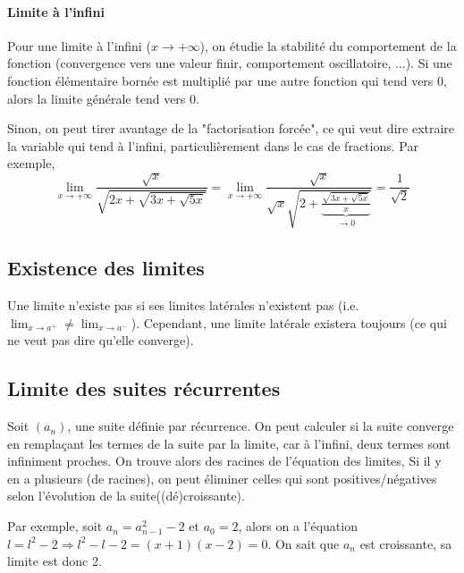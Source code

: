 \documentclass[10pt,a4paper]{book}
\begin{document}
\paragraph{Limite à l'infini}
Pour une limite à l'infini ($x\to +\infty$), on étudie la stabilité du comportement de la fonction (convergence vers une valeur finir, comportement oscillatoire, ...). Si une fonction élémentaire bornée est multiplié par une autre fonction qui tend vers 0, alors la limite générale tend vers 0.\par 
Sinon, on peut tirer avantage de la "factorisation forcée", ce qui veut dire extraire la variable qui tend à l'infini, particulièrement dans le cas de fractions. Par exemple, 
\[\lim_{x\to +\infty}\frac{\sqrt{x}}{\sqrt{2x+\sqrt{3x+\sqrt{5x}}}} = 
\lim_{x\to +\infty}\frac{\sqrt{x}}{\sqrt{x}\sqrt{2+\underbrace{\frac{\sqrt{3x+\sqrt{5x}}}{x}}_{\to 0}}}= \frac{1}{\sqrt{2}}\]

\subsection{Existence des limites}
Une limite n'existe pas si ses limites latérales n'existent pas (i.e. $\lim_{x\to a^+}\neq\lim_{x\to a^-}$). Cependant, une limite latérale existera toujours (ce qui ne veut pas dire qu'elle converge).

\subsection{Limite des suites récurrentes}
Soit $(a_n)$, une suite définie par récurrence. On peut calculer si la suite converge en remplaçant les termes de la suite par la limite, car à l'infini, deux termes sont infiniment proches. On trouve alors des racines de l'équation des limites, Si il y en a plusieurs (de racines), on peut éliminer celles qui sont positives/négatives selon l'évolution de la suite((dé)croissante).\par 
Par exemple, soit $a_n=a_{n-1}^2-2$ et $a_0=2$, alors on a l'équation $l=l^2-2\Rightarrow l^2-l-2=(x+1)(x-2)=0$. On sait que $a_n$ est croissante, sa limite est donc 2.
\end{document}
